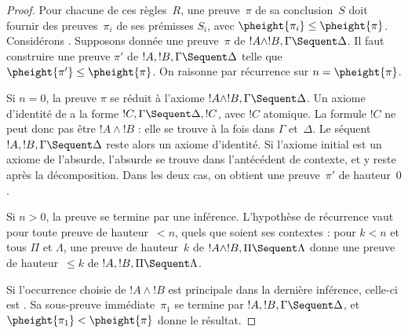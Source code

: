 \documentclass[../../../include/open-logic-section]{subfiles}
\begin{document}
\begin{proof}
Pour chacune de ces règles~$R$, une preuve~$\pi$
de sa conclusion~$S$ doit fournir des preuves~$\pi_i$
de ses prémisses $S_i$, avec
$\pheight{\pi_i} \le \pheight{\pi}$.
Considérons \LeftR{\land}. Supposons donnée une
preuve~$\pi$ de $!A \land !B, \Gamma \Sequent \Delta$.
Il faut construire une preuve $\pi'$ de
$!A, !B, \Gamma \Sequent \Delta$ telle que
$\pheight{\pi'} \le \pheight{\pi}$.
On raisonne par récurrence sur $n = \pheight{\pi}$.

Si $n = 0$, la preuve $\pi$ se réduit à l'axiome
$!A \land !B, \Gamma \Sequent \Delta$.
Un axiome d'identité de  a la forme
$!C, \Gamma \Sequent \Delta, !C$, avec $!C$ atomique.
La formule $!C$ ne peut donc pas être $!A \land !B$ :
elle se trouve à la fois dans $\Gamma$ et~$\Delta$.
Le séquent $!A, !B, \Gamma \Sequent \Delta$
reste alors un axiome d'identité.
Si l'axiome initial est un axiome de l'absurde,
l'absurde se trouve dans l'antécédent de contexte,
et y reste après la décomposition.
Dans les deux cas, on obtient une preuve~$\pi'$
de hauteur~$0$.

Si $n>0$, la preuve se termine par une inférence.
L'hypothèse de récurrence vaut pour toute preuve
de hauteur~$<n$, quels que soient ses contextes :
pour $k<n$ et tous $\Pi$ et $\Lambda$,
une preuve de hauteur~$k$ de
$!A \land !B, \Pi \Sequent \Lambda$ donne une
preuve de hauteur~$\le k$ de
$!A, !B, \Pi \Sequent \Lambda$.

Si l'occurrence choisie de $!A \land !B$ est
principale dans la dernière inférence, celle-ci
est \LeftR{\land}. Sa sous-preuve immédiate~$\pi_1$
se termine par $!A, !B, \Gamma \Sequent \Delta$,
et $\pheight{\pi_1} < \pheight{\pi}$ donne le résultat.


\end{proof}
\end{document}
